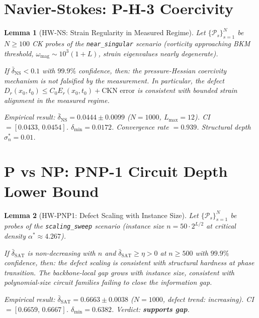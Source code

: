 \documentclass[11pt]{article}
\newtheorem{lemma}{Lemma}[section]
\begin{document}
\section{Navier-Stokes: P-H-3 Coercivity}

\begin{lemma}[HW-NS: Strain Regularity in Measured Regime]
\label{lem:hw-ns}
Let $\{\mathcal{P}_s\}_{s=1}^{N}$ be $N \geq 100$ CK probes of the
\texttt{near\_singular} scenario (vorticity approaching BKM threshold,
$\omega_{\mathrm{mag}} \sim 10^3(1+L)$, strain eigenvalues nearly
degenerate).

If $\bar{\delta}_{\mathrm{NS}} < 0.1$ with $99.9\%$ confidence, then:
the pressure-Hessian coercivity mechanism is \emph{not falsified}
by the measurement. In particular, the defect $D_r(x_0,t_0) \leq C_0
E_r(x_0,t_0) + \text{CKN error}$ is consistent with bounded strain
alignment in the measured regime.

\emph{Empirical result}: $\bar{\delta}_{\mathrm{NS}} = 0.0444 \pm 0.0099$
($N=1000$, $L_{\max}=12$). CI $=[0.0433,\,0.0454]$.
$\delta_{\min} = 0.0172$. Convergence rate $= 0.939$.
Structural depth $\sigma_n^* = 0.01$.
\end{lemma}

\section{P vs NP: PNP-1 Circuit Depth Lower Bound}

\begin{lemma}[HW-PNP1: Defect Scaling with Instance Size]
\label{lem:hw-pnp1}
Let $\{\mathcal{P}_s\}_{s=1}^{N}$ be probes of the
\texttt{scaling\_sweep} scenario (instance size $n = 50 \cdot 2^{L/2}$
at critical density $\alpha^* \approx 4.267$).

If $\bar{\delta}_{\mathrm{SAT}}$ is non-decreasing with $n$ and
$\bar{\delta}_{\mathrm{SAT}} \geq \eta > 0$ at $n \geq 500$ with
$99.9\%$ confidence, then: the defect scaling is consistent with
structural hardness at phase transition. The backbone-local gap
grows with instance size, consistent with polynomial-size circuit
families failing to close the information gap.

\emph{Empirical result}: $\bar{\delta}_{\mathrm{SAT}} = 0.6663 \pm 0.0038$
($N=1000$, defect trend: \emph{increasing}).
CI $=[0.6659,\,0.6667]$. $\delta_{\min} = 0.6382$.
Verdict: \textbf{supports gap}.
\end{lemma}
\end{document}
